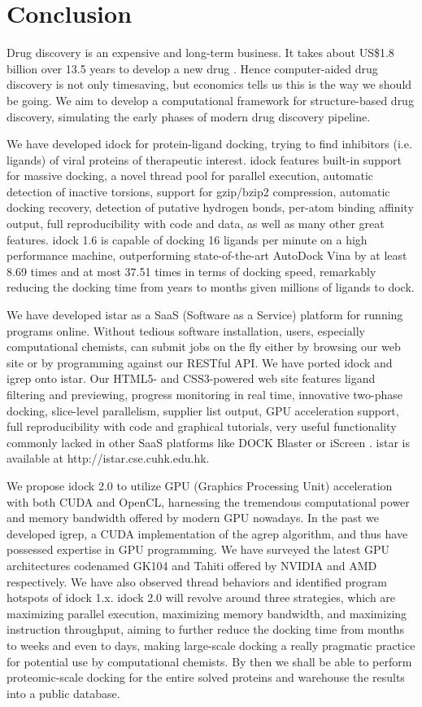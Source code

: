 \chapter{Conclusion}

Drug discovery is an expensive and long-term business. It takes about US\$1.8 billion over 13.5 years to develop a new drug \citep{716}. Hence computer-aided drug discovery is not only timesaving, but economics tells us this is the way we should be going. We aim to develop a computational framework for structure-based drug discovery, simulating the early phases of modern drug discovery pipeline.

We have developed idock for protein-ligand docking, trying to find inhibitors (i.e. ligands) of viral proteins of therapeutic interest. idock features built-in support for massive docking, a novel thread pool for parallel execution, automatic detection of inactive torsions, support for gzip/bzip2 compression, automatic docking recovery, detection of putative hydrogen bonds, per-atom binding affinity output, full reproducibility with code and data, as well as many other great features. idock 1.6 is capable of docking 16 ligands per minute on a high performance machine, outperforming state-of-the-art AutoDock Vina \citep{595} by at least 8.69 times and at most 37.51 times in terms of docking speed, remarkably reducing the docking time from years to months given millions of ligands to dock.

We have developed istar as a SaaS (Software as a Service) platform for running programs online. Without tedious software installation, users, especially computational chemists, can submit jobs on the fly either by browsing our web site or by programming against our RESTful API. We have ported idock and igrep onto istar. Our HTML5- and CSS3-powered web site features ligand filtering and previewing, progress monitoring in real time, innovative two-phase docking, slice-level parallelism, supplier list output, GPU acceleration support, full reproducibility with code and graphical tutorials, very useful functionality commonly lacked in other SaaS platforms like DOCK Blaster \citep{557} or iScreen \citep{899}. istar is available at http://istar.cse.cuhk.edu.hk.

We propose idock 2.0 to utilize GPU (Graphics Processing Unit) acceleration with both CUDA and OpenCL, harnessing the tremendous computational power and memory bandwidth offered by modern GPU nowadays. In the past we developed igrep, a CUDA implementation of the agrep algorithm, and thus have possessed expertise in GPU programming. We have surveyed the latest GPU architectures codenamed GK104 and Tahiti offered by NVIDIA and AMD respectively. We have also observed thread behaviors and identified program hotspots of idock 1.x. idock 2.0 will revolve around three strategies, which are maximizing parallel execution, maximizing memory bandwidth, and maximizing instruction throughput, aiming to further reduce the docking time from months to weeks and even to days, making large-scale docking a really pragmatic practice for potential use by computational chemists. By then we shall be able to perform proteomic-scale docking for the entire solved proteins and warehouse the results into a public database.

